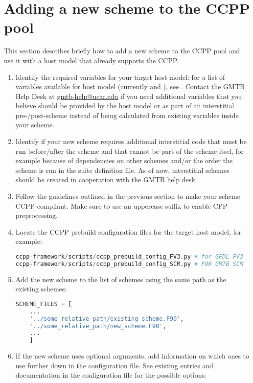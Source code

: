 \section{Adding a new scheme to the CCPP pool}
\label{sec_addscheme}
This section describes briefly how to add a new scheme to the CCPP pool and use it with a host model that already supports the CCPP.
\begin{enumerate}
\item Identify the required variables for your target host model: for a list of variables available for host model  (currently  and ), see . Contact the GMTB Help Desk at \url{gmtb-help@ucar.edu} if you need additional variables that you believe should be provided by the host model or as part of an interstitial pre-/post-scheme instead of being calculated from existing variables inside your scheme.
\item Identify if your new scheme requires additional interstitial code that must be run before/after the scheme and that cannot be part of the scheme itsel, for example because of dependencies on other schemes and/or the order the scheme is run in the suite definition file. As of now, interstitial schemes should be created in cooperation with the GMTB help desk.
\item Follow the guidelines outlined in the previous section to make your scheme CCPP-compliant. Make sure to use an uppercase suffix  to enable CPP preprocessing.
\item Locate the CCPP prebuild configuration files for the target host model, for example:
\begin{lstlisting}[language=Python]
ccpp-framework/scripts/ccpp_prebuild_config_FV3.py # for GFDL FV3
ccpp-framework/scripts/ccpp_prebuild_config_SCM.py # FOR GMTB SCM
\end{lstlisting}
\item Add the new scheme to the list of schemes using the same path as the existing schemes:
\begin{samepage}
\begin{lstlisting}[language=Python]
SCHEME_FILES = [
    ...
    '../some_relative_path/existing_scheme.F90',
    '../some_relative_path/new_scheme.F90',
    ...
    ]
\end{lstlisting}
\end{samepage}
\item If the new scheme uses optional arguments, add information on which ones to use further down in the configuration file. See existing entries and documentation in the configuration file for the possible options:

\end{enumerate}
